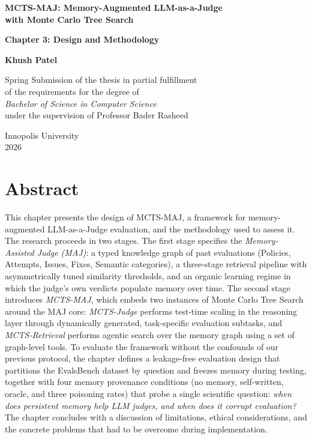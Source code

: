 \documentclass[12pt,a4paper]{report}
\begin{document}
\begin{titlepage}
\begin{center}
\vspace*{3cm}

{\LARGE \textbf{MCTS-MAJ: Memory-Augmented LLM-as-a-Judge\\ with Monte Carlo Tree Search}}

\vspace{1.5cm}

{\Large \textbf{Chapter 3: Design and Methodology}}

\vspace{2cm}

{\large \textbf{Khush Patel}}

\vspace{1.5cm}

Spring Submission of the thesis in partial fulfillment\\
of the requirements for the degree of\\
\textit{Bachelor of Science in Computer Science}\\[0.5cm]
under the supervision of Professor Bader Rasheed

\vfill

Innopolis University\\
2026

\end{center}
\end{titlepage}

\chapter*{Abstract}

This chapter presents the design of MCTS-MAJ, a framework for memory-augmented LLM-as-a-Judge evaluation, and the methodology used to assess it. The research proceeds in two stages. The first stage specifies the \textit{Memory-Assisted Judge (MAJ)}: a typed knowledge graph of past evaluations (Policies, Attempts, Issues, Fixes, Semantic categories), a three-stage retrieval pipeline with asymmetrically tuned similarity thresholds, and an organic learning regime in which the judge's own verdicts populate memory over time. The second stage introduces \textit{MCTS-MAJ}, which embeds two instances of Monte Carlo Tree Search around the MAJ core: \textit{MCTS-Judge} performs test-time scaling in the reasoning layer through dynamically generated, task-specific evaluation subtasks, and \textit{MCTS-Retrieval} performs agentic search over the memory graph using a set of graph-level tools. To evaluate the framework without the confounds of our previous protocol, the chapter defines a leakage-free evaluation design that partitions the EvalsBench dataset by question and freezes memory during testing, together with four memory provenance conditions (no memory, self-written, oracle, and three poisoning rates) that probe a single scientific question: \textit{when does persistent memory help LLM judges, and when does it corrupt evaluation?} The chapter concludes with a discussion of limitations, ethical considerations, and the concrete problems that had to be overcome during implementation.
\end{document}
